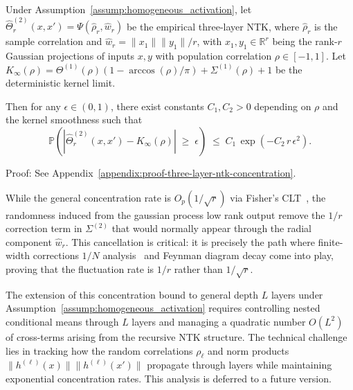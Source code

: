 \begin{corollary}\label{cor:two_layer_ntk_concentration}
Under Assumption~\ref{assump:homogeneous_activation}, let \( \hat{\Theta}^{(2)}_r(x,x') = \Psi(\hat{\rho}_r, \hat{w}_r) \) be the empirical three-layer NTK, where \( \hat{\rho}_r \) is the sample correlation and \( \hat{w}_r = \|x_1\|\|y_1\|/r \), with \( x_1, y_1 \in \mathbb{R}^r \) being the rank-\( r \) Gaussian projections of inputs \( x, y \) with population correlation \( \rho \in [-1,1] \). Let \( K_{\infty}(\rho) = \Theta^{(1)}(\rho)(1 - \arccos(\rho)/\pi) + \Sigma^{(1)}(\rho) + 1 \) be the deterministic kernel limit.

Then for any \( \epsilon \in (0,1) \), there exist constants \( C_1, C_2 > 0 \) depending on \( \rho \) and the kernel smoothness such that
\[
\mathbb{P}\!\left(\left|\hat{\Theta}^{(2)}_r(x,x') - K_{\infty}(\rho)\right|\;\ge\;\epsilon\right)\;\le\;C_1\,\exp\!\left(-C_2\,r\,\epsilon^2\right).
\]
\end{corollary}

Proof: See Appendix~\ref{appendix:proof-three-layer-ntk-concentration}.

\begin{remark}
While the general concentration rate is \( O_p(1/\sqrt{r}) \) via Fisher's CLT~\cite{fisher1915probable,hotelling1953new}, the randomness induced from the gaussian process low rank output remove the \( 1/r \) correction term in \( \Sigma^{(2)} \) that would normally appear through the radial component \( \hat{w}_r \). This cancellation is critical: it is precisely the path where finite-width corrections \( 1/N \) analysis~\cite{dyer2019asymptoticswidenetworksfeynman} and Feynman diagram decay come into play, proving that the fluctuation rate is \( 1/r \) rather than \( 1/\sqrt{r} \).
\end{remark}

\begin{remark}
The extension of this concentration bound to general depth \( L \) layers under Assumption~\ref{assump:homogeneous_activation} requires controlling nested conditional means through \( L \) layers and managing a quadratic number \( O(L^2) \) of cross-terms arising from the recursive NTK structure. The technical challenge lies in tracking how the random correlations \( \rho_\ell \) and norm products \( \|h^{(\ell)}(x)\|\|h^{(\ell)}(x')\| \) propagate through layers while maintaining exponential concentration rates. This analysis is deferred to a future version.
\end{remark}

